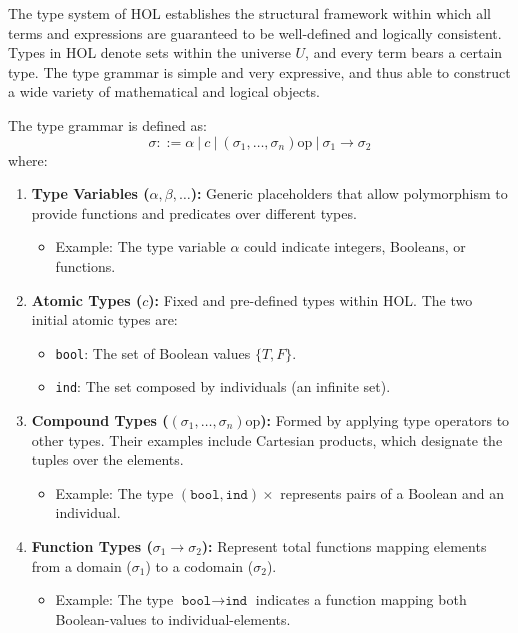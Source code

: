 The type system of HOL establishes the structural framework within which all terms and expressions are guaranteed to be well-defined and logically consistent. Types in HOL denote sets within the universe \( U \), and every term bears a certain type. The type grammar is simple and very expressive, and thus able to construct a wide variety of mathematical and logical objects.

The type grammar is defined as:
\[
\sigma ::= \alpha \ | \ c \ | \ (\sigma_1, \ldots, \sigma_n)\text{op} \ | \ \sigma_1 \to \sigma_2
\]
where:
\begin{enumerate}
    \item \textbf{Type Variables (\(\alpha, \beta, \ldots\)):} Generic placeholders that allow polymorphism to provide functions and predicates over different types.
    \begin{itemize}
        \item Example: The type variable \(\alpha\) could indicate integers, Booleans, or functions.
    \end{itemize}

    \item \textbf{Atomic Types (\(c\)):} Fixed and pre-defined types within HOL. The two initial atomic types are:
    \begin{itemize}
        \item \texttt{bool}: The set of Boolean values \(\{T, F\}\).
        \item \texttt{ind}: The set composed by individuals (an infinite set).

    \end{itemize}

    \item \textbf{Compound Types (\((\sigma_1, \ldots, \sigma_n)\text{op}\)):} Formed by applying type operators to other types. Their examples include Cartesian products, which designate the tuples over the elements.
    \begin{itemize}
        \item Example: The type \((\texttt{bool}, \texttt{ind}) \times\) represents pairs of a Boolean and an individual.
    \end{itemize}

    \item \textbf{Function Types (\(\sigma_1 \to \sigma_2\)):} Represent total functions mapping elements from a domain (\(\sigma_1\)) to a codomain (\(\sigma_2\)).
    \begin{itemize}
        \item Example: The type \(\texttt{bool} \to \texttt{ind}\) indicates a function mapping both Boolean-values to individual-elements.
    \end{itemize}
\end{enumerate}

